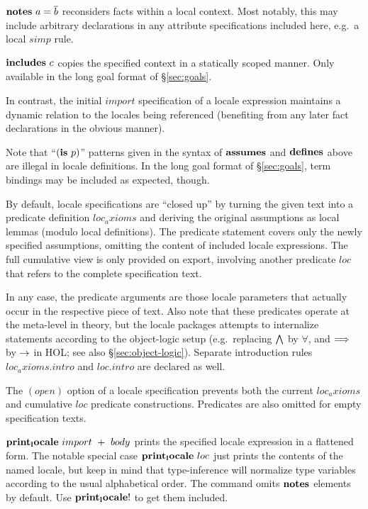 \begin{descr}
\begin{descr}
  \item [$\NOTES{a}{\vec b}$] reconsiders facts within a local context.  Most
    notably, this may include arbitrary declarations in any attribute
    specifications included here, e.g.\ a local $simp$ rule.

  \item [${\mathord{\mathbf{includes}}}~c$] copies the specified context in a statically scoped
    manner.  Only available in the long goal format of \S\ref{sec:goals}.

    In contrast, the initial $import$ specification of a locale expression
    maintains a dynamic relation to the locales being referenced (benefiting
    from any later fact declarations in the obvious manner).
  \end{descr}
  
  Note that ``$({\mathord{\mathbf{is}}}~p)$'' patterns given in the syntax of ${\mathord{\mathbf{assumes}}}$ and
  ${\mathord{\mathbf{defines}}}$ above are illegal in locale definitions.  In the long goal
  format of \S\ref{sec:goals}, term bindings may be included as expected,
  though.
  
  \medskip By default, locale specifications are ``closed up'' by turning the
  given text into a predicate definition $loc_axioms$ and deriving the
  original assumptions as local lemmas (modulo local definitions).  The
  predicate statement covers only the newly specified assumptions, omitting
  the content of included locale expressions.  The full cumulative view is
  only provided on export, involving another predicate $loc$ that refers to
  the complete specification text.
  
  In any case, the predicate arguments are those locale parameters that
  actually occur in the respective piece of text.  Also note that these
  predicates operate at the meta-level in theory, but the locale packages
  attempts to internalize statements according to the object-logic setup
  (e.g.\ replacing $\bigwedge$ by $\forall$, and $\Longrightarrow$ by $\rightarrow$ in HOL; see
  also \S\ref{sec:object-logic}).  Separate introduction rules
  $loc_axioms.intro$ and $loc.intro$ are declared as well.
  
  The $(open)$ option of a locale specification prevents both the current
  $loc_axioms$ and cumulative $loc$ predicate constructions.  Predicates are
  also omitted for empty specification texts.

\item [${\mathord{\mathbf{print_locale}}}~import~+~body$] prints the specified locale
  expression in a flattened form.  The notable special case
  ${\mathord{\mathbf{print_locale}}}~loc$ just prints the contents of the named
  locale, but keep in mind that type-inference will normalize type variables
  according to the usual alphabetical order.  The command omits
  ${\mathord{\mathbf{notes}}}$ elements by default.  Use
  ${\mathord{\mathbf{print_locale}}}!$ to get them included.


\end{descr}
